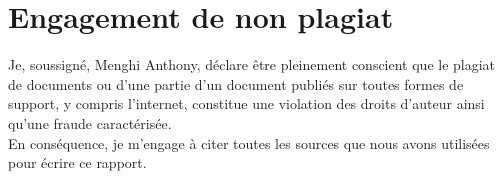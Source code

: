 \chapter*{Engagement de non plagiat}

Je, soussigné, Menghi Anthony, déclare être pleinement conscient que le plagiat de documents ou d’une partie d’un document publiés sur toutes formes de support, y compris l’internet, constitue une violation des droits d’auteur ainsi qu’une fraude caractérisée.  \\
En conséquence, je m’engage à citer toutes les sources que nous avons utilisées pour écrire ce rapport.